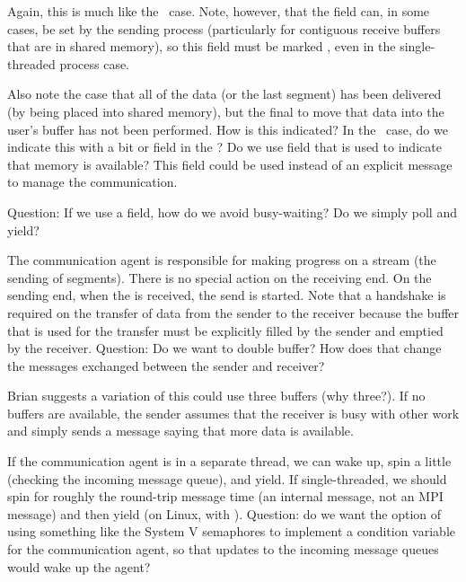
Again, this is much like the \tcpname\ case.  Note, however, that the
 field can, in some cases, be set by the
sending process (particularly for contiguous receive buffers that are in
shared memory), so this field must be marked , even in the
single-threaded process case.

Also note the case that all of the data (or the last segment) has been
delivered (by being placed 
into shared memory), but the final  to move that data
into the user's buffer has not been performed.  How is this indicated?  
In the \shmemname\ case, do we indicate
this with a bit or field in the ?  Do we use  field that is used to indicate
that memory is available?  This field could be used instead of an explicit
message to manage the communication.  

Question: If we use a  field, how do we avoid
busy-waiting?  Do we simply poll and yield?


The communication agent is responsible for making progress on a stream (the
sending of segments).  There is no special action on the receiving end.  On
the sending end, when the  is received, the
send is started.  Note that a handshake is required on the transfer of data
from the sender to the receiver because the buffer that is used for the
transfer must be explicitly filled by the sender and emptied by the receiver.
Question: Do we want to double buffer?  How does that change the messages
exchanged between the sender and receiver?

Brian suggests a variation of this could use three buffers (why three?).  If
no buffers are available, the 
sender assumes that the receiver is busy with other work and simply sends a
message saying that more data is available.  

If the communication agent is in a separate thread, we can wake up, spin a
little (checking the incoming message queue), and yield.  If single-threaded,
we should spin for roughly the round-trip message time (an internal message,
not an MPI message) and then yield (on Linux, with ).
Question: do we want the option of using something like the System V
semaphores to implement a condition variable for the communication agent, so
that updates to the incoming message queues would wake up the agent?

